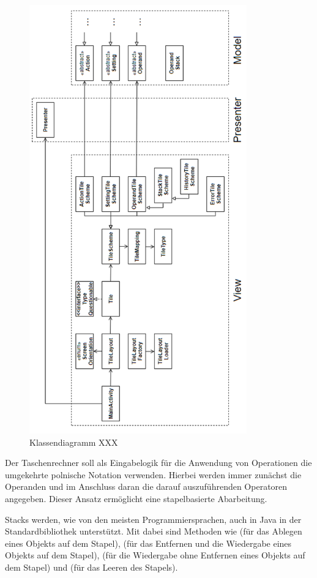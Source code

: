 \begin{figure}[!h]
	\includegraphics[width=\textwidth,height=50em,keepaspectratio]{img/schnittstellen-klassendiagramm}
	\caption[Klassendiagramm]{Klassendiagramm XXX\footnotemark}
\end{figure}


\clearpage

Der Taschenrechner soll als Eingabelogik für die Anwendung von Operationen die umgekehrte polnische Notation verwenden. Hierbei werden immer zunächst die Operanden und im Anschluss daran die darauf auszuführenden Operatoren angegeben. Dieser Ansatz ermöglicht eine stapelbasierte Abarbeitung. 

Stacks werden, wie von den meisten Programmiersprachen, auch in Java in der Standardbibliothek unterstützt. Mit dabei sind Methoden wie  (für das Ablegen eines Objekts auf dem Stapel),  (für das Entfernen und die Wiedergabe eines Objekts auf dem Stapel),  (für die Wiedergabe ohne Entfernen eines Objekts auf dem Stapel) und  (für das Leeren des Stapels). 


